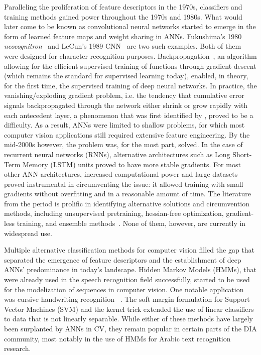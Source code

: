 Paralleling the proliferation of feature descriptors in the 1970s, classifiers
and training methods gained power throughout the 1970s and 1980s. What would
later come to be known as convolutional neural networks started to emerge in
the form of learned feature maps and weight sharing in ANNs. Fukushima’s 1980
\emph{neocognitron}~\cite{fukushima1982neocognitron} and LeCun's 1989
CNN~\cite{lecun1989backpropagation} are two such examples. Both of them were
designed for character recognition purposes.
Backpropagation~\cite{rumelhart1986learning}, an algorithm allowing for the
efficient supervised training of functions through gradient descent (which
remains the standard for supervised learning today), enabled, in theory, for
the first time, the supervised training of deep neural networks. In practice,
the vanishing/exploding gradient problem, i.e. the tendency that cumulative
error signals backpropagated through the network either shrink or grow
rapidly with each antecedent layer, a phenomenon that was first identified by
\cite{hochreiter1991untersuchungen}, proved to be a difficulty. As a result,
ANNs were limited to shallow problems, for which most computer vision
applications still required extensive feature engineering. By the mid-2000s
however, the problem was, for the most part, solved. In the case of recurrent
neural networks (RNNs), alternative architectures such as Long Short-Term
Memory (LSTM) units proved to have more stable gradients.  For most other ANN
architectures, increased computational power and large datasets proved
instrumental in circumventing the issue: it allowed training with small
gradients without overfitting and in a reasonable amount of time. The
literature from the period is prolific in identifying alternative solutions and
circumvention methods, including unsupervised pretraining, hessian-free
optimization, gradient-less training, and ensemble methods~\cite[sec.
5.9]{schmidhuber2014deep}. None of them, however, are currently in widespread
use.

Multiple alternative classification methods for computer vision filled the gap
that separated the emergence of feature descriptors and the establishment of
deep ANNs' predominance in today’s landscape. Hidden Markov Models (HMMs), that
were already used in the speech recognition field successfully, started to be
used for the modelization of sequences in computer vision. One notable
application was cursive handwriting recognition
~\cite{kaltenmeier1993sophisticated}. The soft-margin formulation
for Support Vector Machines (SVM) and the kernel trick extended the use of
linear classifiers to data that is not linearly separable. While either of
these methods have largely been surplanted by ANNs in CV, they remain popular
in certain parts of the DIA community, most notably in the use of HMMs for
Arabic text recognition research.

